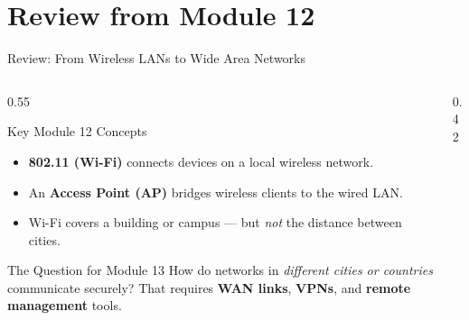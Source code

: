 \documentclass[aspectratio=169]{beamer}  %
\begin{document}
\section*{Review from Module 12}

\begin{frame}{Review: From Wireless LANs to Wide Area Networks}
    \begin{columns}[T]
        \begin{column}{0.55\textwidth}
            \begin{block}{Key Module 12 Concepts}
                \begin{itemize}
                    \item \textbf{802.11 (Wi-Fi)} connects devices on a local wireless network.
                    \item An \textbf{Access Point (AP)} bridges wireless clients to the wired LAN.
                    \item Wi-Fi covers a building or campus --- but \textit{not} the distance between cities.
                \end{itemize}
            \end{block}
            \vspace{0.3em}
            \begin{exampleblock}{The Question for Module 13}
                How do networks in \textit{different cities or countries} communicate securely?
                That requires \textbf{WAN links}, \textbf{VPNs}, and \textbf{remote management} tools.
            \end{exampleblock}
        \end{column}
        \begin{column}{0.42\textwidth}
            \begin{center}
\end{center}
\end{column}
\end{columns}
\end{frame}
\end{document}
